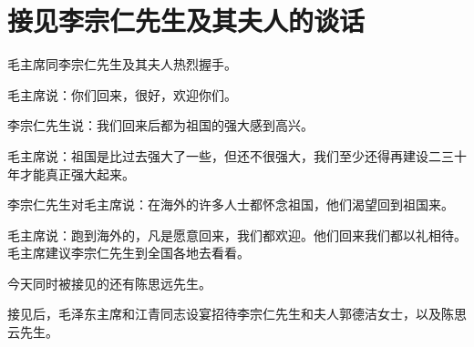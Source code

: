 \section[接见李宗仁先生及其夫人的谈话（一九六五年七月二十七日）]{接见李宗仁先生及其夫人的谈话}


毛主席同李宗仁先生及其夫人热烈握手。

毛主席说：你们回来，很好，欢迎你们。

李宗仁先生说：我们回来后都为祖国的强大感到高兴。

毛主席说：祖国是比过去强大了一些，但还不很强大，我们至少还得再建设二三十年才能真正强大起来。

李宗仁先生对毛主席说：在海外的许多人士都怀念祖国，他们渴望回到祖国来。

毛主席说：跑到海外的，凡是愿意回来，我们都欢迎。他们回来我们都以礼相待。毛主席建议李宗仁先生到全国各地去看看。

今天同时被接见的还有陈思远先生。

接见后，毛泽东主席和江青同志设宴招待李宗仁先生和夫人郭德洁女士，以及陈思云先生。


